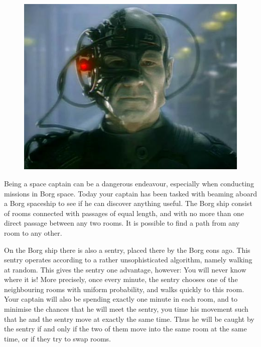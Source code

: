 
\begin{figure}
\vspace{-5mm}
\includegraphics[width=\linewidth,keepaspectratio=true]{borg/borg}
\vspace{-9mm}
\end{figure}

\noindent
Being a space captain can be a dangerous endeavour, especially when conducting missions in Borg space. Today your captain has been tasked with beaming aboard a Borg spaceship to see if he can discover anything useful. The Borg ship consist of rooms connected with passages of equal length, and with no more than one direct passage between any two rooms. It is possible to find a path from any room to any other.

On the Borg ship there is also a sentry, placed there by the Borg eons ago. This sentry operates according to a rather unsophisticated algorithm, namely walking at random. This gives the sentry one advantage, however: You will never know where it is! More precisely, once every minute, the sentry chooses one of the neighbouring rooms with uniform probability, and walks quickly to this room. Your captain will also be spending exactly one minute in each room, and to minimise the chances that he will meet the sentry, you time his movement such that he and the sentry move at exactly the same time. Thus he will be caught by the sentry if and only if the two of them move into the same room at the same time, or if they try to swap rooms. 

